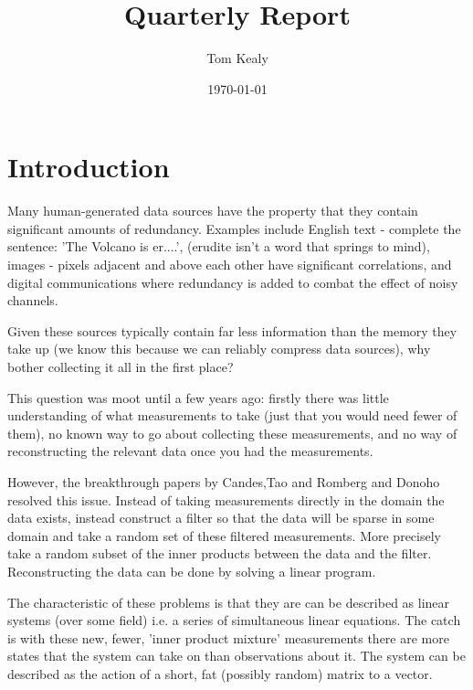 \documentclass{article}
\begin{document}
\title{Quarterly Report}
\author{Tom Kealy}

\date{\today}

\maketitle

\section{Introduction}
Many human-generated data sources have the property that they contain significant amounts of redundancy. Examples include English text - complete the sentence: 'The Volcano is er....', (erudite isn't a word that springs to mind), images - pixels adjacent and above each other have significant correlations, and digital communications where redundancy is added to combat the effect of noisy channels. 

Given these sources typically contain far less information than the memory they take up (we know this because we can reliably compress data sources), why bother collecting it all in the first place?

This question was moot until a few years ago: firstly there was little understanding of what measurements to take (just that you would need fewer of them), no known way to go about collecting these measurements, and no way of reconstructing the relevant data once you had the measurements.

However, the breakthrough papers by Candes,Tao and Romberg \cite{RobustUncertainty} and Donoho \cite{Donoho} resolved this issue. Instead of taking measurements directly in the domain the data exists, instead construct a filter so that the data will be sparse in some domain and take a random set of these filtered measurements. More precisely take a random subset of the inner products between the data and the filter. Reconstructing the data can be done by solving a linear program. 

The characteristic of these problems is that they are can be described as linear systems (over some field) i.e. a series of simultaneous linear equations. The catch is with these new, fewer, 'inner product mixture' measurements there are more states that the system can take on than observations about it. The system can be described as the action of a short, fat (possibly random) matrix to a vector. 
\end{document}
